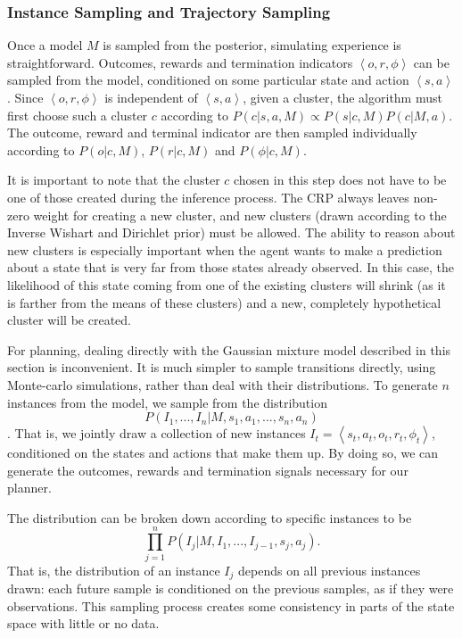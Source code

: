 \subsubsection{Instance Sampling and Trajectory Sampling}

\label{sec:models:roar:traj-sample}

Once a model $M$ is sampled from the  posterior, simulating experience is straightforward. Outcomes, rewards and termination indicators $\left<o,r,\phi\right>$ can be sampled from the model, conditioned on some particular state and action $\left<s,a\right>$. Since $\left<o,r,\phi\right>$ is independent of $\left<s,a\right>$, given a cluster, the algorithm must first choose such a cluster $c$ according to $P(c|s,a,M)\propto P(s|c,M)P(c|M,a)$. The outcome, reward and terminal indicator are then sampled individually according to $P(o|c,M)$, $P(r|c,M)$ and $P(\phi|c,M)$.

It is important to note that the cluster $c$ chosen in this step does not have to be one of those created during the inference process. The CRP always leaves non-zero weight for creating a new cluster, and new clusters (drawn according to the Inverse Wishart and Dirichlet prior) must be allowed. The ability to reason about new clusters is especially important when the agent wants to make a prediction about a state that is very far from those states already observed. In this case, the likelihood of this state coming from one of the existing clusters will shrink (as it is farther from the means of these clusters) and a new, completely hypothetical cluster will be created.

For planning, dealing directly with the Gaussian mixture model described in this section is inconvenient. It is much simpler to sample transitions directly, using Monte-carlo simulations, rather than deal with their distributions. To generate $n$ instances from the model, we sample from the distribution $$P(I_1,...,I_n|M,s_1,a_1,...,s_n,a_n)$$. That is, we jointly draw a collection of new instances $I_t=\left<s_t,a_t,o_t,r_t,\phi_t\right>$, conditioned on the states and actions that make them up. By doing so, we can generate the outcomes, rewards and termination signals necessary for our planner.

The distribution can be broken down according to specific instances to be $$\prod_{j=1}^n P(I_j|M,I_1,...,I_{j-1},s_j,a_j).$$ That is, the distribution of an instance $I_j$ depends on all previous instances drawn: each future sample is conditioned on the previous samples, as if they were observations. This sampling process creates some consistency in parts of the state space with little or no data.

